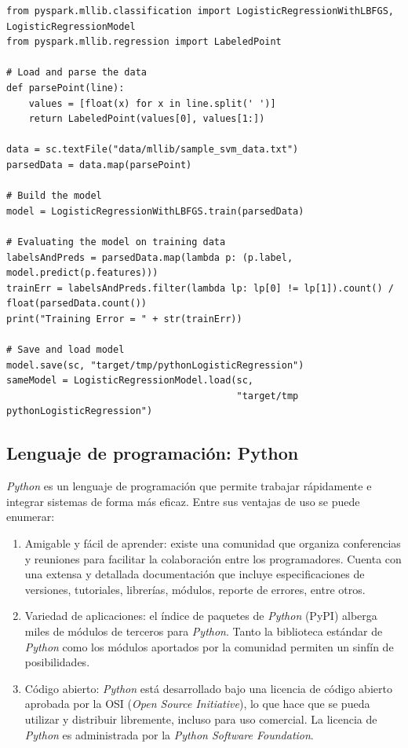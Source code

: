 \begin{lstlisting}
from pyspark.mllib.classification import LogisticRegressionWithLBFGS, LogisticRegressionModel
from pyspark.mllib.regression import LabeledPoint

# Load and parse the data 
def parsePoint(line):
    values = [float(x) for x in line.split(' ')]
    return LabeledPoint(values[0], values[1:])

data = sc.textFile("data/mllib/sample_svm_data.txt")
parsedData = data.map(parsePoint)

# Build the model
model = LogisticRegressionWithLBFGS.train(parsedData)

# Evaluating the model on training data
labelsAndPreds = parsedData.map(lambda p: (p.label, model.predict(p.features)))
trainErr = labelsAndPreds.filter(lambda lp: lp[0] != lp[1]).count() / float(parsedData.count())
print("Training Error = " + str(trainErr))

# Save and load model
model.save(sc, "target/tmp/pythonLogisticRegression")
sameModel = LogisticRegressionModel.load(sc,
                                         "target/tmp pythonLogisticRegression")
\end{lstlisting}

\subsection{Lenguaje de programación: Python}
\textit{Python} es un lenguaje de programación que permite trabajar rápidamente e integrar sistemas de forma más eficaz. Entre sus ventajas de uso se puede enumerar:
\begin{enumerate}
\item Amigable y fácil de aprender: existe una comunidad que organiza conferencias y reuniones para facilitar la colaboración entre los programadores. Cuenta con una extensa y detallada documentación que incluye especificaciones de versiones, tutoriales, librerías, módulos, reporte de errores, entre otros.
\item Variedad de aplicaciones: el índice de paquetes de \textit{Python} (PyPI) alberga miles de módulos de terceros para \textit{Python}. Tanto la biblioteca estándar de \textit{Python} como los módulos aportados por la comunidad permiten un sinfín de posibilidades.
\item Código abierto: \textit{Python} está desarrollado bajo una licencia de código abierto aprobada por la OSI (\textit{Open Source Initiative}), lo que hace que se pueda utilizar y distribuir libremente, incluso para uso comercial. La licencia de \textit{Python} es administrada por la \textit{Python Software Foundation}.
\end{enumerate}


